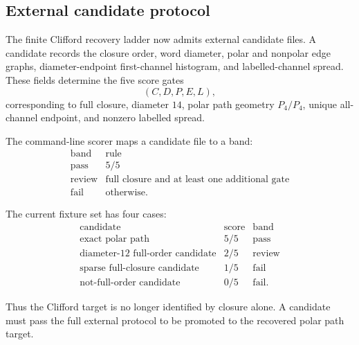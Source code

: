 \subsection{External candidate protocol}
\label{sec:bt1276-external-candidate-protocol}

The finite Clifford recovery ladder now admits external candidate files.  A candidate records the closure order, word diameter, polar and nonpolar edge graphs, diameter-endpoint first-channel histogram, and labelled-channel spread.  These fields determine the five score gates
\[
(C,D,P,E,L),
\]
corresponding to full closure, diameter \(14\), polar path geometry \(P_4/P_4\), unique all-channel endpoint, and nonzero labelled spread.

The command-line scorer maps a candidate file to a band:
\[
\begin{array}{c|c}
\text{band} & \text{rule}\\
\hline
\mathrm{pass} & 5/5\\
\mathrm{review} & \text{full closure and at least one additional gate}\\
\mathrm{fail} & \text{otherwise.}
\end{array}
\]

The current fixture set has four cases:
\[
\begin{array}{c|c|c}
\text{candidate} & \text{score} & \text{band}\\
\hline
\text{exact polar path} & 5/5 & \mathrm{pass}\\
\text{diameter-12 full-order candidate} & 2/5 & \mathrm{review}\\
\text{sparse full-closure candidate} & 1/5 & \mathrm{fail}\\
\text{not-full-order candidate} & 0/5 & \mathrm{fail}.
\end{array}
\]

Thus the Clifford target is no longer identified by closure alone.  A candidate must pass the full external protocol to be promoted to the recovered polar path target.
